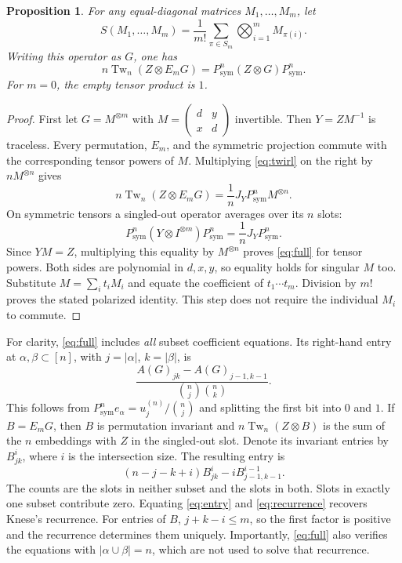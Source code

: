 \documentclass[11pt,a4paper]{article}
\newtheorem{proposition}[theorem]{Proposition}
\theoremstyle{remark}\newtheorem{remark}[theorem]{Remark}
\DeclareMathOperator{\Tw}{Tw}
\newcommand{\Ps}{P_{\mathrm{sym}}}
\newcommand{\bin}[2]{\binom{#1}{#2}}
\begin{document}
\begin{proposition}\label{prop:equal}
For any equal-diagonal matrices $M_1,\ldots,M_m$, let
\[
 S(M_1,\ldots,M_m)=\frac1{m!}\sum_{\pi\in S_m}
                         \bigotimes_{i=1}^m M_{\pi(i)}.
\]
Writing this operator as $G$, one has
\begin{equation}\label{eq:full}
 n\Tw_n(Z\otimes E_mG)=\Ps^n(Z\otimes G)\Ps^n.
\end{equation}
For $m=0$, the empty tensor product is $1$.
\end{proposition}
\begin{proof}
First let $G=M^{\otimes m}$ with $M=\left(\begin{smallmatrix}d&y\\x&d\end{smallmatrix}\right)$ invertible. Then $Y=ZM^{-1}$ is traceless. Every permutation, $E_m$, and the symmetric projection commute with the corresponding tensor powers of $M$. Multiplying \eqref{eq:twirl} on the right by $nM^{\otimes n}$ gives
\[
 n\Tw_n(Z\otimes E_mG)=\frac1n J_Y\Ps^nM^{\otimes n}.
\]
On symmetric tensors a singled-out operator averages over its $n$ slots:
\[
 \Ps^n(Y\otimes I^{\otimes m})\Ps^n=\frac1n J_Y\Ps^n.
\]
Since $YM=Z$, multiplying this equality by $M^{\otimes n}$ proves \eqref{eq:full} for tensor powers. Both sides are polynomial in $d,x,y$, so equality holds for singular $M$ too. Substitute $M=\sum_i t_iM_i$ and equate the coefficient of $t_1\cdots t_m$. Division by $m!$ proves the stated polarized identity. This step does not require the individual $M_i$ to commute.
\end{proof}

For clarity, \eqref{eq:full} includes \emph{all} subset coefficient equations. Its right-hand entry at $\alpha,\beta\subset[n]$, with $j=|\alpha|$, $k=|\beta|$, is
\begin{equation}\label{eq:entry}
 \frac{A(G)_{jk}-A(G)_{j-1,k-1}}{\bin nj\bin nk}.
\end{equation}
This follows from $\Ps^ne_\alpha=u_j^{(n)}/\bin nj$ and splitting the first bit into $0$ and $1$. If $B=E_mG$, then $B$ is permutation invariant and
$n\Tw_n(Z\otimes B)$ is the sum of the $n$ embeddings with $Z$ in the singled-out slot. Denote its invariant entries by $B_{jk}^i$, where $i$ is the intersection size. The resulting entry is
\begin{equation}\label{eq:recurrence}
 (n-j-k+i)B_{jk}^i-iB_{j-1,k-1}^{i-1}.
\end{equation}
The counts are the slots in neither subset and the slots in both. Slots in exactly one subset contribute zero. Equating \eqref{eq:entry} and \eqref{eq:recurrence} recovers Knese's recurrence. For entries of $B$, $j+k-i\leq m$, so the first factor is positive and the recurrence determines them uniquely. Importantly, \eqref{eq:full} also verifies the equations with $|\alpha\cup\beta|=n$, which are not used to solve that recurrence.
\end{document}
